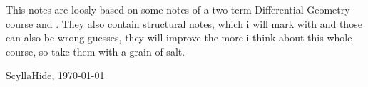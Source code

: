 This notes are loosly based on some notes of a two term Differential Geometry course and \cite{Lee}. They also contain structural notes, which i will mark with  and those can also be wrong guesses, they will improve the more i think about this whole course, so take them with a grain of salt.

ScyllaHide, \today